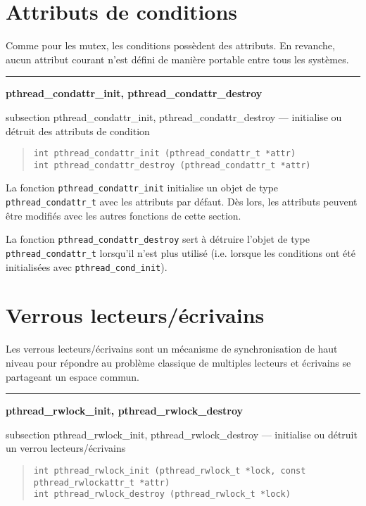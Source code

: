 \documentclass [twoside] {report}
\newcommand {\primitive} [1]
    {
	\phantomsection
	{\large \bf #1}
	\addcontentsline {toc} {subsection} {#1}
    }
\newcommand {\separation}
    {
	\vspace {5mm}
	\nopagebreak
	\hrule
    }
\begin{document}
\section {Attributs de conditions}

Comme pour les mutex, les conditions possèdent des attributs. En
revanche, aucun attribut courant n'est défini de manière portable
entre tous les systèmes.


\separation
\primitive {pthread\_condattr\_init, pthread\_condattr\_destroy} --- initialise ou détruit des attributs de condition

\begin {quote}
\begin {verbatim}
int pthread_condattr_init (pthread_condattr_t *attr)
int pthread_condattr_destroy (pthread_condattr_t *attr)
\end{verbatim}
\end {quote}

La fonction \verb|pthread_condattr_init| initialise un objet de type
\verb|pthread_condattr_t| avec les attributs par défaut. Dès lors,
les attributs peuvent être modifiés avec les autres fonctions de
cette section.

La fonction \verb|pthread_condattr_destroy| sert à détruire
l'objet de type \verb|pthread_condattr_t| lorsqu'il n'est plus
utilisé (i.e.  lorsque les conditions ont été initialisées avec
\verb|pthread_cond_init|).


\section {Verrous lecteurs/écrivains}

Les verrous lecteurs/écrivains sont un mécanisme de synchronisation de
haut niveau pour répondre au problème classique de multiples lecteurs
et écrivains se partageant un espace commun.

\separation
\primitive {pthread\_rwlock\_init, pthread\_rwlock\_destroy} --- initialise ou détruit un verrou lecteurs/écrivains

\begin {quote}
\begin {verbatim}
int pthread_rwlock_init (pthread_rwlock_t *lock, const pthread_rwlockattr_t *attr)
int pthread_rwlock_destroy (pthread_rwlock_t *lock)
\end{verbatim}
\end {quote}
\end{document}
